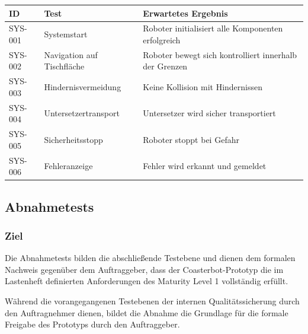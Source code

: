 \documentclass[
  a4paper,
  12pt,
  DIV=12,        %
  parskip=half,  %
  headings=small %
]{scrartcl}
\theoremstyle{definition}
\theoremstyle{definition}
\begin{document}
\begin{longtable}[]{@{}
  >{\raggedright\arraybackslash}p{}
  >{\raggedright\arraybackslash}p{}
  >{\raggedright\arraybackslash}p{}@{}}
\toprule\noalign{}
\begin{minipage}[b]{\linewidth}\raggedright
ID
\end{minipage} & \begin{minipage}[b]{\linewidth}\raggedright
Test
\end{minipage} & \begin{minipage}[b]{\linewidth}\raggedright
Erwartetes Ergebnis
\end{minipage} \\
\midrule\noalign{}
\endhead
\bottomrule\noalign{}
\endlastfoot
SYS-001 & Systemstart & Roboter initialisiert alle Komponenten
erfolgreich \\
SYS-002 & Navigation auf Tischfläche & Roboter bewegt sich kontrolliert
innerhalb der Grenzen \\
SYS-003 & Hindernisvermeidung & Keine Kollision mit Hindernissen \\
SYS-004 & Untersetzertransport & Untersetzer wird sicher
transportiert \\
SYS-005 & Sicherheitsstopp & Roboter stoppt bei Gefahr \\
SYS-006 & Fehleranzeige & Fehler wird erkannt und gemeldet \\
\end{longtable}

\subsection{Abnahmetests}\label{abnahmetests}

\subsubsection{Ziel}\label{ziel-4}

Die Abnahmetests bilden die abschließende Testebene und dienen dem
formalen Nachweis gegenüber dem Auftraggeber, dass der
Coasterbot-Prototyp die im Lastenheft definierten Anforderungen des
Maturity Level 1 vollständig erfüllt.

Während die vorangegangenen Testebenen der internen Qualitätssicherung
durch den Auftragnehmer dienen, bildet die Abnahme die Grundlage für die
formale Freigabe des Prototyps durch den Auftraggeber.
\end{document}
